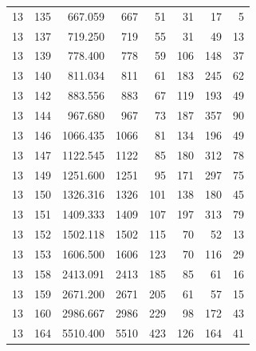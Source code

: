 \documentclass[11pt]{article}
\theoremstyle{definition}
\begin{document}
{\begin{longtable}{rrrrrrrr}
13 & 135 & 667.059 & 667 & 51 & 31 & 17 & 5 \\
13 & 137 & 719.250 & 719 & 55 & 31 & 49 & 13 \\
13 & 139 & 778.400 & 778 & 59 & 106 & 148 & 37 \\
13 & 140 & 811.034 & 811 & 61 & 183 & 245 & 62 \\
13 & 142 & 883.556 & 883 & 67 & 119 & 193 & 49 \\
13 & 144 & 967.680 & 967 & 73 & 187 & 357 & 90 \\
13 & 146 & 1066.435 & 1066 & 81 & 134 & 196 & 49 \\
13 & 147 & 1122.545 & 1122 & 85 & 180 & 312 & 78 \\
13 & 149 & 1251.600 & 1251 & 95 & 171 & 297 & 75 \\
13 & 150 & 1326.316 & 1326 & 101 & 138 & 180 & 45 \\
13 & 151 & 1409.333 & 1409 & 107 & 197 & 313 & 79 \\
13 & 152 & 1502.118 & 1502 & 115 & 70 & 52 & 13 \\
13 & 153 & 1606.500 & 1606 & 123 & 70 & 116 & 29 \\
13 & 158 & 2413.091 & 2413 & 185 & 85 & 61 & 16 \\
13 & 159 & 2671.200 & 2671 & 205 & 61 & 57 & 15 \\
13 & 160 & 2986.667 & 2986 & 229 & 98 & 172 & 43 \\
13 & 164 & 5510.400 & 5510 & 423 & 126 & 164 & 41 \\
\end{longtable}
}
\end{document}
